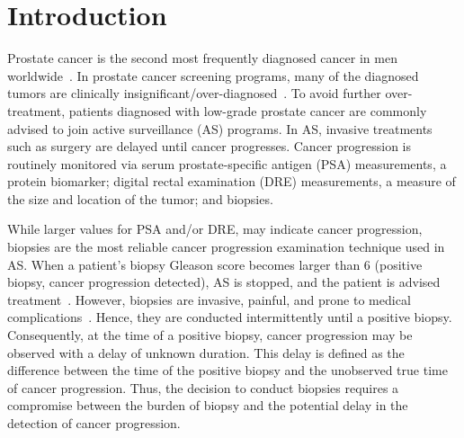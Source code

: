 \section{Introduction}
\label{c3:sec:introduction}
Prostate cancer is the second most frequently diagnosed cancer in men worldwide~\citep{GlobalCancerStats2012}. In prostate cancer screening programs, many of the diagnosed tumors are clinically insignificant/over-diagnosed~\citep{etzioni2002overdiagnosis}. To avoid further over-treatment, patients diagnosed with low-grade prostate cancer are commonly advised to join active surveillance (AS) programs. In AS, invasive treatments such as surgery are delayed until cancer progresses. Cancer progression is routinely monitored via serum prostate-specific antigen (PSA) measurements, a protein biomarker; digital rectal examination (DRE) measurements, a measure of the size and location of the tumor; and biopsies.

While larger values for PSA and/or DRE, may indicate cancer progression, biopsies are the most reliable cancer progression examination technique used in AS. When a patient's biopsy Gleason score becomes larger than 6 (positive biopsy, cancer progression detected), AS is stopped, and the patient is advised treatment~\citep{bokhorst2015compliance}. However, biopsies are invasive, painful, and prone to medical complications~\citep{ehdaie2014impact,fujita2009serial}. Hence, they are conducted intermittently until a positive biopsy. Consequently, at the time of a positive biopsy, cancer progression may be observed with a delay of unknown duration. This delay is defined as the difference between the time of the positive biopsy and the unobserved true time of cancer progression. Thus, the decision to conduct biopsies requires a compromise between the burden of biopsy and the potential delay in the detection of cancer progression.


